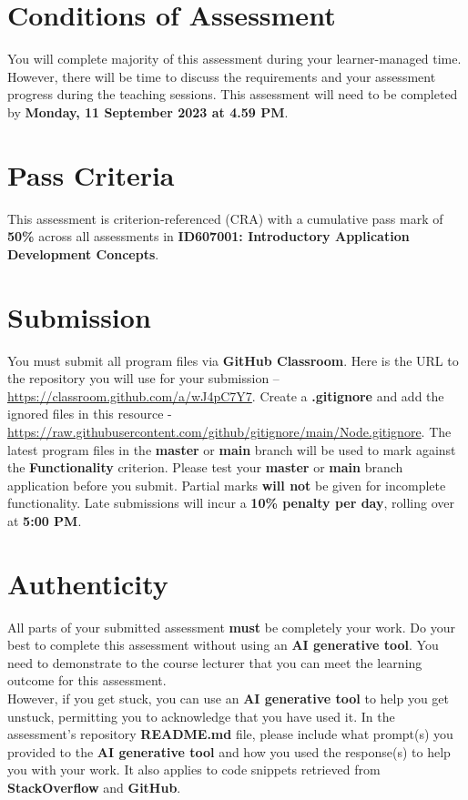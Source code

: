 \documentclass{article}
\begin{document}
\section*{Conditions of Assessment}
You will complete majority of this assessment during your learner-managed time. However, there will be time to discuss the requirements and your assessment progress during the teaching sessions. This assessment will need to be completed by \textbf{Monday, 11 September 2023 at 4.59 PM}.

\section*{Pass Criteria}
This assessment is criterion-referenced (CRA) with a cumulative pass mark of \textbf{50\%} across all assessments in \textbf{ID607001: Introductory Application Development Concepts}.

\section*{Submission}
You must submit all program files via \textbf{GitHub Classroom}. Here is the URL to the repository you will use for your submission – \href{https://classroom.github.com/a/wJ4pC7Y7}{https://classroom.github.com/a/wJ4pC7Y7}. Create a \textbf{.gitignore} and add the ignored files in this resource - \href{https://raw.githubusercontent.com/github/gitignore/main/Node.gitignore}{https://raw.githubusercontent.com/github/gitignore/main/Node.gitignore}. The latest program files in the \textbf{master} or \textbf{main} branch will be used to mark against the \textbf{Functionality} criterion. Please test your \textbf{master} or \textbf{main} branch application before you submit. Partial marks \textbf{will not} be given for incomplete functionality. Late submissions will incur a \textbf{10\% penalty per day}, rolling over at \textbf{5:00 PM}.

\section*{Authenticity}
All parts of your submitted assessment \textbf{must} be completely your work. Do your best to complete this assessment without using an \textbf{AI generative tool}. You need to demonstrate to the course lecturer that you can meet the learning outcome for this assessment. \\
 
 However, if you get stuck, you can use an \textbf{AI generative tool} to help you get unstuck, permitting you to acknowledge that you have used it. In the assessment's repository \textbf{README.md} file, please include what prompt(s) you provided to the \textbf{AI generative tool} and how you used the response(s) to help you with your work. It also applies to code snippets retrieved from \textbf{StackOverflow} and \textbf{GitHub}. \\
 
\end{document}
